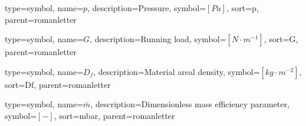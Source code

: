{
	type=symbol, %
	name={\ensuremath{p}}, %
	description={Pressure}, %
	symbol={$\left[Pa\right]$}, %
	sort=p, %
	parent=romanletter %
}

{
type=symbol, %
name={\ensuremath{G}}, %
description={Running load}, %
symbol={$\left[N\cdot m^{-1}\right]$}, %
sort=G, %
parent=romanletter %
}


{
type=symbol, %
name={\ensuremath{D_f}}, %
description={Material areal density}, %
symbol={$\left[kg\cdot m^{-2}\right]$}, %
sort=Df, %
parent=romanletter %
}

{
type=symbol, %
name={\ensuremath{\bar{m}}}, %
description={Dimensionless mass efficiency parameter}, %
symbol={$\left[-\right]$}, %
sort=mbar, %
parent=romanletter %
}

